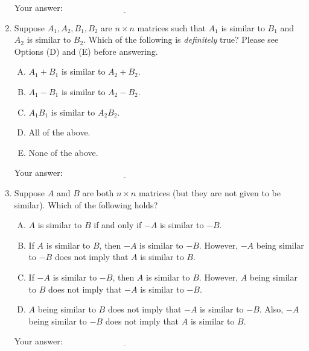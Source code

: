 \documentclass[10pt]{amsart}
\begin{document}
\begin{enumerate}
  \vspace{0.1in}
  Your answer: $\underline{\qquad\qquad\qquad\qquad\qquad\qquad\qquad}$
  \vspace{0.1in}

\item Suppose $A_1,A_2,B_1,B_2$ are $n \times n$ matrices such that
  $A_1$ is similar to $B_1$ and $A_2$ is similar to $B_2$. Which of
  the following is {\em definitely} true? Please see Options (D) and
  (E) before answering.

  \begin{enumerate}[(A)]
  \item $A_1 + B_1$ is similar to $A_2 + B_2$.
  \item $A_1 - B_1$ is similar to $A_2 - B_2$.
  \item $A_1B_1$ is similar to $A_2B_2$.
  \item All of the above.
  \item None of the above.
  \end{enumerate}

  \vspace{0.1in}
  Your answer: $\underline{\qquad\qquad\qquad\qquad\qquad\qquad\qquad}$
  \vspace{0.1in}

\item Suppose $A$ and $B$ are both $n \times n$ matrices
  (but they are not given to be similar). Which of the following
  holds?

  \begin{enumerate}[(A)]
  \item $A$ is similar to $B$ if and only if $-A$ is similar to $-B$.
  \item If $A$ is similar to $B$, then $-A$ is similar to
    $-B$. However, $-A$ being similar to $-B$ does not
    imply that $A$ is similar to $B$.
  \item If $-A$ is similar to $-B$, then $A$ is similar to
    $B$. However, $A$ being similar to $B$ does not imply that
    $-A$ is similar to $-B$.
  \item $A$ being similar to $B$ does not imply that $-A$ is
    similar to $-B$. Also, $-A$ being similar to $-B$ does
    not imply that $A$ is similar to $B$.
  \end{enumerate}

  \vspace{0.1in}
  Your answer: $\underline{\qquad\qquad\qquad\qquad\qquad\qquad\qquad}$
  \vspace{0.1in}
 

\end{enumerate}
\end{document}
